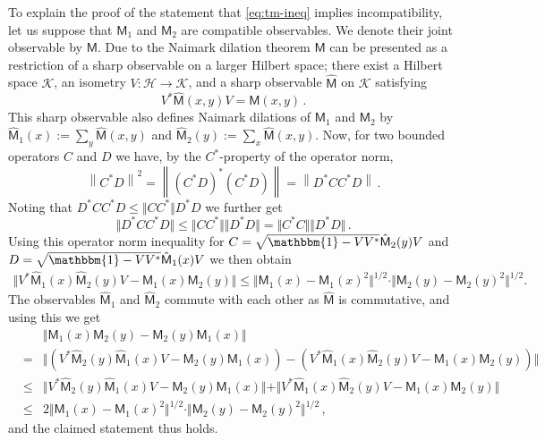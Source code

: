 \documentclass[12pt]{iopart}
\theoremstyle{definition}
\newcommand{\hi}{\mathcal{H}} %
\newcommand{\hik}{\mathcal{K}} %
\newcommand{\no}[1]{\left\|#1\right\|} %
\newcommand{\id}{\mathbbm{1}} %
\newcommand{\Mo}{\mathsf{M}}%
\begin{document}
To explain the proof of the statement that \eqref{eq:tm-ineq} implies 
incompatibility, let us suppose that $\Mo_1$ and $\Mo_2$ are compatible 
observables. We denote their joint observable by $\Mo$. Due to the Naimark 
dilation theorem $\Mo$ can be presented as a restriction of a sharp 
observable on a larger Hilbert space; there exist a Hilbert space $\hik$, an isometry 
$V: \hi \to \hik$, and a sharp observable $\hat{\Mo}$ 
on $\hik$ satisfying 
\begin{equation}
V^*\hat{\Mo}(x,y)V = \Mo(x,y) \, .
\end{equation}
This sharp observable also defines Naimark dilations of $\Mo_1$ and $\Mo_2$ 
by $\hat{\Mo}_1(x):= \sum_y \hat{\Mo}(x,y)$ and $\hat{\Mo}_2(y) := \sum_x \hat{\Mo}(x,y)$.
Now, for two bounded operators $C$ and $D$ we have, by the $C^*$-property of the operator norm, 
\begin{equation}
\no{C^* D}^2 = \no{(C^*D)^*(C^*D)} = \no{D^*CC^*D} \, .
\end{equation}
Noting that $D^*C C^*D \leq \Vert C C^*\Vert D^* D$
we further get
\begin{equation} 
\Vert D^*C C^*D\Vert \leq 
\Vert CC^*\Vert \Vert D^*D\Vert 
= \Vert C^* C\Vert \Vert D^*D\Vert \, . 
\end{equation}
Using this operator norm inequality  
for $C= \sqrt{\id - VV^*} \hat{\Mo}_2(y) V$ and 
$D= \sqrt{\id - VV^*} \hat{\Mo}_1(x) V$ we then obtain 
\begin{align}
\Vert V^* \hat{\Mo}_1(x) \hat{\Mo}_2(y) V - \Mo_1(x)\Mo_2(y) \Vert 
\leq \Vert \Mo_1(x)  - \Mo_1(x)^2 \Vert^{1/2} 
\cdot \Vert \Mo_2(y) - \Mo_2(y)^2 \Vert^{1/2}.  
\end{align}
The observables $\hat{\Mo}_1$ and $\hat{\Mo}_2$ commute with each other as $\hat{\Mo}$ is commutative, and using this we get
\begin{eqnarray*}
&&
\Vert \Mo_1(x) \Mo_2(y) - \Mo_2(y) \Mo_1(x) \Vert 
\\
&=& \Vert
 (V^* \hat{\Mo}_2(y) \hat{\Mo}_1(x) V - \Mo_2(y)\Mo_1(x))  
-(V^* \hat{\Mo}_1(x) \hat{\Mo}_2(y) V - \Mo_1(x)\Mo_2(y)) \Vert 
\\
&\leq & 
\Vert
 V^* \hat{\Mo}_2(y) \hat{\Mo}_1(x) V - \Mo_2(y)\Mo_1(x) 
\Vert 
+ \Vert 
V^* \hat{\Mo}_1(x) \hat{\Mo}_2(y) V - \Mo_1(x)\Mo_2(y) \Vert 
\\
&\leq &
2 
\Vert \Mo_1(x)  - \Mo_1(x)^2 \Vert^{1/2} 
\cdot \Vert \Mo_2(y) - \Mo_2(y)^2 \Vert^{1/2} \, , 
\label{eq:tm-ineq-2}  
\end{eqnarray*}
and the claimed statement thus holds. 
\end{document}
